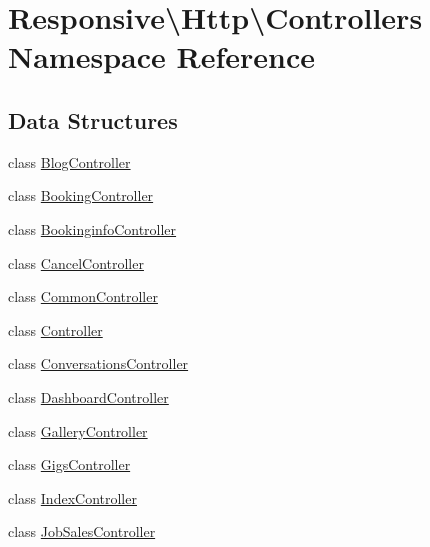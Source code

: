 \hypertarget{namespace_responsive_1_1_http_1_1_controllers}{}\section{Responsive\textbackslash{}Http\textbackslash{}Controllers Namespace Reference}
\label{namespace_responsive_1_1_http_1_1_controllers}
\subsection*{Data Structures}
\begin{DoxyCompactItemize}
\item 
class \mbox{\hyperlink{class_responsive_1_1_http_1_1_controllers_1_1_blog_controller}{Blog\+Controller}}
\item 
class \mbox{\hyperlink{class_responsive_1_1_http_1_1_controllers_1_1_booking_controller}{Booking\+Controller}}
\item 
class \mbox{\hyperlink{class_responsive_1_1_http_1_1_controllers_1_1_bookinginfo_controller}{Bookinginfo\+Controller}}
\item 
class \mbox{\hyperlink{class_responsive_1_1_http_1_1_controllers_1_1_cancel_controller}{Cancel\+Controller}}
\item 
class \mbox{\hyperlink{class_responsive_1_1_http_1_1_controllers_1_1_common_controller}{Common\+Controller}}
\item 
class \mbox{\hyperlink{class_responsive_1_1_http_1_1_controllers_1_1_controller}{Controller}}
\item 
class \mbox{\hyperlink{class_responsive_1_1_http_1_1_controllers_1_1_conversations_controller}{Conversations\+Controller}}
\item 
class \mbox{\hyperlink{class_responsive_1_1_http_1_1_controllers_1_1_dashboard_controller}{Dashboard\+Controller}}
\item 
class \mbox{\hyperlink{class_responsive_1_1_http_1_1_controllers_1_1_gallery_controller}{Gallery\+Controller}}
\item 
class \mbox{\hyperlink{class_responsive_1_1_http_1_1_controllers_1_1_gigs_controller}{Gigs\+Controller}}
\item 
class \mbox{\hyperlink{class_responsive_1_1_http_1_1_controllers_1_1_index_controller}{Index\+Controller}}
\item 
class \mbox{\hyperlink{class_responsive_1_1_http_1_1_controllers_1_1_job_sales_controller}{Job\+Sales\+Controller}}

\end{DoxyCompactItemize}
